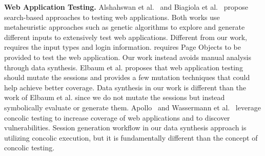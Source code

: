 \documentclass[10pt,conference]{IEEEtran}
\begin{document}
\textbf{Web Application Testing.}
Alshahswan et al.~\cite{alshahwan2011automated} and Biagiola et al.~\cite{biagiola2017search} propose search-based approaches to testing web applications. Both works use metaheuristic approaches such as genetic algorithms to explore and generate different inputs to extensively test web applications.
Different from our work, \cite{alshahwan2011automated} requires the input types and login information. \cite{biagiola2017search} requires Page Objects to be provided to test the web application. Our work instead avoids manual analysis through data synthesis. %
Elbaum et al. \cite{sessiontest} proposes that web application testing should mutate the sessions and provides a few mutation techniques that could help achieve better coverage. Data synthesis in our work is different than the work of Elbaum et al. since we do not mutate the sessions but instead symbolically evaluate or generate them. Apollo~\cite{apollo} and Wassermann et al.~\cite{phpdym} leverage concolic testing to increase coverage of web applications and to discover vulnerabilities. Session generation workflow in our data synthesis approach is utilizing concolic execution, but it is fundamentally different than the concept of concolic testing.

%





\end{document}
